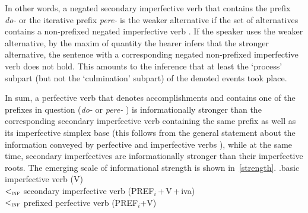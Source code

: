 In other words, a negated secondary imperfective  verb  that contains the prefix \textit{do-}   or the iterative prefix \textit{pere-}   is the weaker alternative if the set of alternatives contains a non-prefixed negated imperfective verb . If the speaker uses the weaker alternative, by the maxim of quantity \citep{Grice:75} the hearer infers that the stronger alternative, the sentence with a corresponding negated non-prefixed imperfective verb  does not hold. This amounts to the inference that at least the `process' subpart (but not the `culmination' subpart) of the denoted events took place.

In sum, a perfective verb  that denotes accomplishments and contains one of the prefixes in question (\textit{do-}   or \textit{pere-}  ) is informationally stronger than the corresponding secondary imperfective  verb  containing the same prefix as well as its imperfective simplex base (this follows from the general statement about the information conveyed by perfective and imperfective verbs ), while at the same time, secondary imperfectives  are informationally stronger than their imperfective roots. The emerging scale of informational strength is shown in~\ref{strength}.
\ex.\label{strength}basic imperfective verb  (V)\\
$<_{\textsc{inf}}$ secondary imperfective  verb  (PREF$_i$\,+\,V\,+\,iva)\\ $<_{\textsc{inf}}$ prefixed perfective verb  (PREF$_i$+V)

